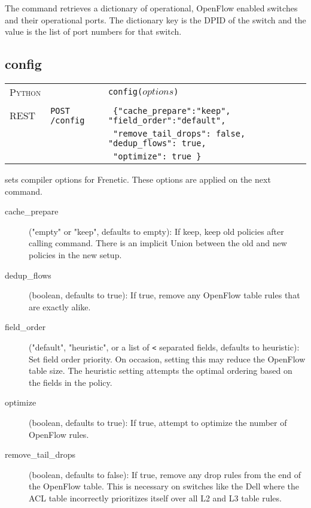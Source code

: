 The  command retrieves a dictionary of operational, OpenFlow enabled switches
and their operational ports.  The dictionary key is the DPID of the switch and the value is the
list of port numbers for that switch.    

\subsection{config}

\bigskip
\begin{tabularx}{\linewidth}{llX}
\textsc{Python} &  & \texttt{config($options$)} \\ \\
\textsc{REST} & \texttt{POST /config} & 
  \texttt{ \{"cache\_prepare":"keep", "field\_order":"default", } \\
  & & \texttt{ "remove\_tail\_drops": false, "dedup\_flows": true, } \\ 
  & & \texttt{ "optimize": true \} } \\ 
\end{tabularx}

 sets compiler options for Frenetic.  These options are applied on the next 
command.  

\begin{description}
\item[cache\_prepare] ("empty" or "keep", defaults to empty): If keep, keep old policies after calling  command.
There is an implicit Union between the old and new policies in the new setup.  
\item[dedup\_flows] (boolean, defaults to true): If true, remove any OpenFlow table rules that are exactly
alike.  
\item[field\_order] ("default", "heuristic", or a list of \texttt{<} separated fields, defaults to heuristic): 
  Set field order priority.  On occasion, setting this may reduce the OpenFlow table size.
  The heuristic setting attempts the optimal ordering based on the fields in the policy.
\item[optimize] (boolean, defaults to true): If true, attempt to optimize the number of OpenFlow rules.
\item[remove\_tail\_drops] (boolean, defaults to false): If true, remove any drop rules from the end of the
OpenFlow table.  This is necessary on switches like the Dell where the ACL table incorrectly prioritizes
itself over all L2 and L3 table rules.
\end{description}

